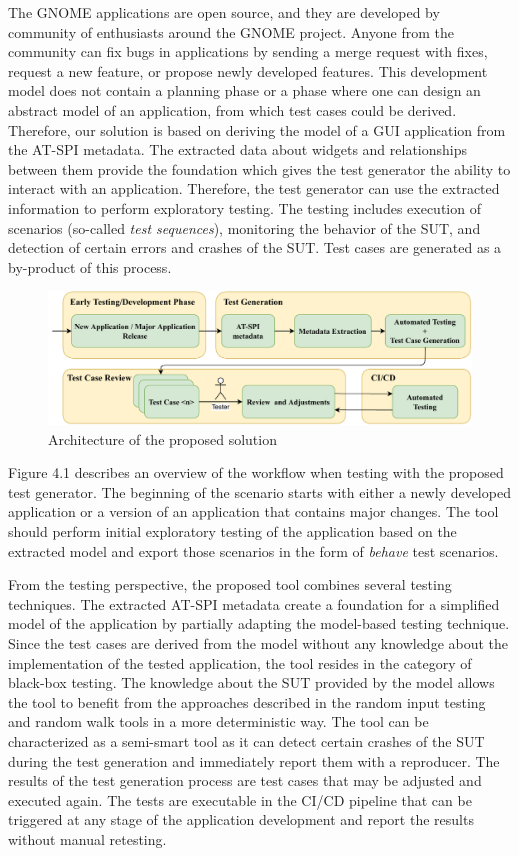 The GNOME applications are open source, and they are developed by community of enthusiasts around the GNOME project. Anyone from the community can fix bugs in applications by sending a merge request with fixes, request a new feature, or propose newly developed features. This development model does not contain a planning phase or a phase where one can design an abstract model of an application, from which test cases could be derived. Therefore, our solution is based on deriving the model of a GUI application from the AT-SPI metadata. The extracted data about widgets and relationships between them provide the foundation which gives the test generator the ability to interact with an application. Therefore, the test generator can use the extracted information to perform exploratory testing. The testing includes execution of scenarios (so-called \textit{test sequences}), monitoring the behavior of the SUT, and detection of certain errors and crashes of the SUT. Test cases are generated as a by-product of this process.

\begin{figure}[hbt]
	\centering
	\includegraphics[width=1\textwidth]{obrazky-figures/overview.pdf}
	\caption{Architecture of the proposed solution}
	\label{Diagram}
\end{figure}

Figure 4.1 describes an overview of the workflow when testing with the proposed test generator. The beginning of the scenario starts with either a newly developed application or a version of an application that contains major changes. The tool should perform initial exploratory testing of the application based on the extracted model and export those scenarios in the form of \textit{behave} test scenarios.

From the testing perspective, the proposed tool combines several testing techniques. The extracted AT-SPI metadata create a foundation for a simplified model of the application by partially adapting the model-based testing technique. Since the test cases are derived from the model without any knowledge about the implementation of the tested application, the tool resides in the category of black-box testing. The knowledge about the SUT provided by the model allows the tool to benefit from the approaches described in the random input testing and random walk tools in a more deterministic way. The tool can be characterized as a semi-smart tool as it can detect certain crashes of the SUT during the test generation and immediately report them with a reproducer. The results of the test generation process are test cases that may be adjusted and executed again. The tests are executable in the CI/CD pipeline that can be triggered at any stage of the application development and report the results without manual retesting.

